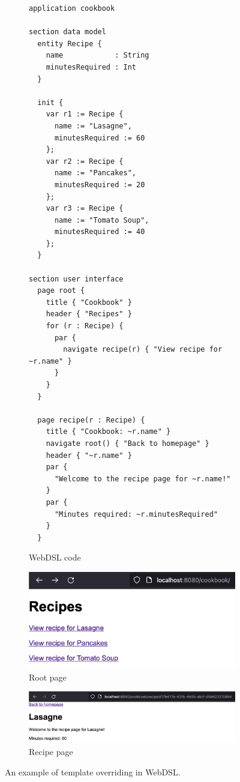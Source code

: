     \begin{figure}
      \begin{subfigure}[t]{0.45\textwidth}
        \begin{verbatim}
application cookbook

section data model
  entity Recipe {
    name            : String
    minutesRequired : Int
  }

  init {
    var r1 := Recipe {
      name := "Lasagne",
      minutesRequired := 60
    };
    var r2 := Recipe {
      name := "Pancakes",
      minutesRequired := 20
    };
    var r3 := Recipe {
      name := "Tomato Soup",
      minutesRequired := 40
    };
  }

section user interface
  page root {
    title { "Cookbook" }
    header { "Recipes" }
    for (r : Recipe) {
      par {
        navigate recipe(r) { "View recipe for ~r.name" }
      }
    }
  }

  page recipe(r : Recipe) {
    title { "Cookbook: ~r.name" }
    navigate root() { "Back to homepage" }
    header { "~r.name" }
    par {
      "Welcome to the recipe page for ~r.name!"
    }
    par {
      "Minutes required: ~r.minutesRequired"
    }
  }
        \end{verbatim}
        \caption{\label{fig:webdsl-data-model-simple-webdsl}WebDSL code}
      \end{subfigure}
      \begin{subfigure}[t]{0.55\textwidth}
        \capstart
        \includegraphics[width=\textwidth]{../img/webdsl-data-model-simple-root}
        \caption{\label{fig:webdsl-data-model-simple-root}Root page}
      \end{subfigure}
      \begin{subfigure}[t]{1\textwidth}
        \capstart
        \includegraphics[width=\textwidth]{../img/webdsl-data-model-simple-recipe}
        \caption{\label{fig:webdsl-data-model-simple-recipe}Recipe page}
      \end{subfigure}
    \caption{\label{fig:webdsl-data-model-simple}An example of template overriding in WebDSL.}
    \end{figure}

